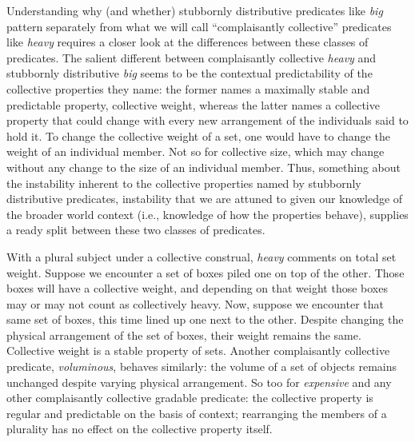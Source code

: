 \documentclass[linguex]{sp}
\begin{document}

Understanding why (and whether) stubbornly distributive predicates like \emph{big} pattern separately from what we will call ``complaisantly collective'' predicates like \emph{heavy} requires a closer look at the differences between these classes of predicates. The salient different between complaisantly collective \emph{heavy} and stubbornly distributive \emph{big} seems to be the contextual predictability of the collective properties they name: the former names a maximally stable and predictable property, collective weight, whereas the latter names a collective property that could change with every new arrangement of the individuals said to hold it. To change the collective weight of a set, one would have to change the weight of an individual member. Not so for collective size, which may change {without} any change to the size of an individual member. Thus, something about the instability inherent to the collective properties named by stubbornly distributive predicates, instability that we are attuned to given our knowledge of the broader world context (i.e., knowledge of how the properties behave), supplies a ready split between these two classes of predicates.

With a plural subject under a collective construal, \emph{heavy} comments on total set weight.  Suppose we encounter a set of boxes piled one on top of the other. Those boxes will have a collective weight, and depending on that weight those boxes may or may not count as collectively heavy. Now, suppose we encounter that same set of boxes, this time lined up one next to the other. Despite changing the physical arrangement of the set of boxes, their weight remains the same.  Collective weight is a stable property of sets. Another complaisantly collective predicate, \emph{voluminous}, behaves similarly: the volume of a set of objects remains unchanged despite varying physical arrangement. So too for \emph{expensive} and any other complaisantly collective gradable predicate: the collective property is regular and predictable on the basis of context; rearranging the members of a plurality has no effect on the collective property itself.
\end{document}

